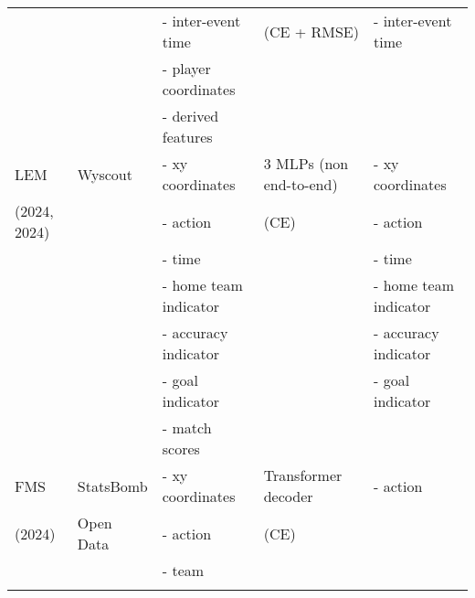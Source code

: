 \begin{table}[h]
\begin{tabular}{lllll}
                 &                     & - inter-event time              & (CE + RMSE)                                & - inter-event time \\ 
                 &                     & - player coordinates            &                                 &                              \\ 
                 &                     & - derived features\footnotemark[2]              &                                 &                              \\ 
\hline
LEM \citep{mendes2024towards,mendes2024forecasting}            & Wyscout \cite{pappalardo2019public}            & - xy coordinates                & 3 MLPs (non end-to-end)                          & - xy coordinates            \\ 
(2024, 2024)                 &                     & - action                        & (CE)                              & - action                    \\ 
                 &                     & - time                          &                                 & - time                      \\ 
                 &                     & - home team indicator                         &                                 & - home team indicator                   \\ 
                 &                     & - accuracy indicator                      &                                 & - accuracy indicator    \\ 
                 &                     & - goal indicator                &                                 & - goal indicator              \\ 
                 &                     & - match scores                        &                                 &                              \\ 
\hline
FMS \citep{baron2024foundation}              & StatsBomb            & - xy coordinates                & Transformer decoder             & - action        \\ 
 (2024)                & Open Data\footnotemark[1]                    & - action                        & (CE)                              &                              \\ 
                 &                     & - team                          &                                 &                              \\ 
\botrule
\end{tabular}

\end{table}

